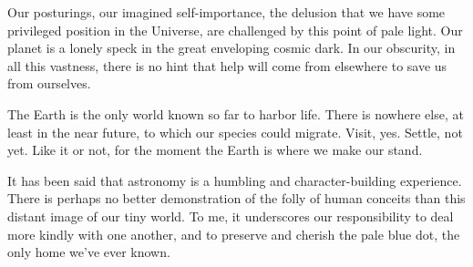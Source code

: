\documentclass[12pt, openany, letterpaper]{memoir}
\begin{document}
Our posturings, our imagined self-importance, the delusion that we have some privileged position in the Universe, are challenged by this point of pale light. Our planet is a lonely speck in the great enveloping cosmic dark. In our obscurity, in all this vastness, there is no hint that help will come from elsewhere to save us from ourselves.

The Earth is the only world known so far to harbor life. There is nowhere else, at least in the near future, to which our species could migrate. Visit, yes. Settle, not yet. Like it or not, for the moment the Earth is where we make our stand.

It has been said that astronomy is a humbling and character-building experience. There is perhaps no better demonstration of the folly of human conceits than this distant image of our tiny world. To me, it underscores our responsibility to deal more kindly with one another, and to preserve and cherish the pale blue dot, the only home we've ever known.
\end{document}
